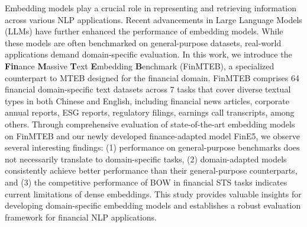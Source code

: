 Embedding models play a crucial role in representing and retrieving information across various NLP applications. Recent advancements in Large Language Models (LLMs) have further enhanced the performance of embedding models. While these models are often benchmarked on general-purpose datasets, real-world applications demand domain-specific evaluation. In this work, we introduce the \textbf{Fin}ance \textbf{M}assive \textbf{T}ext \textbf{E}mbedding \textbf{B}enchmark (FinMTEB), a specialized counterpart to MTEB designed for the financial domain. FinMTEB comprises 64 financial domain-specific text datasets across 7 tasks that cover diverse textual types in both Chinese and English, including financial news articles, corporate annual reports, ESG reports, regulatory filings, earnings call transcripts, among others. Through comprehensive evaluation of state-of-the-art embedding models on FinMTEB and our newly developed finance-adapted model FinE5, we observe several interesting findings: (1) performance on general-purpose benchmarks does not necessarily translate to domain-specific tasks, (2) domain-adapted models consistently achieve better performance than their general-purpose counterparts, and (3) the competitive performance of BOW in financial STS tasks indicates current limitations of dense embeddings. This study provides valuable insights for developing domain-specific embedding models and establishes a robust evaluation framework for financial NLP applications.
